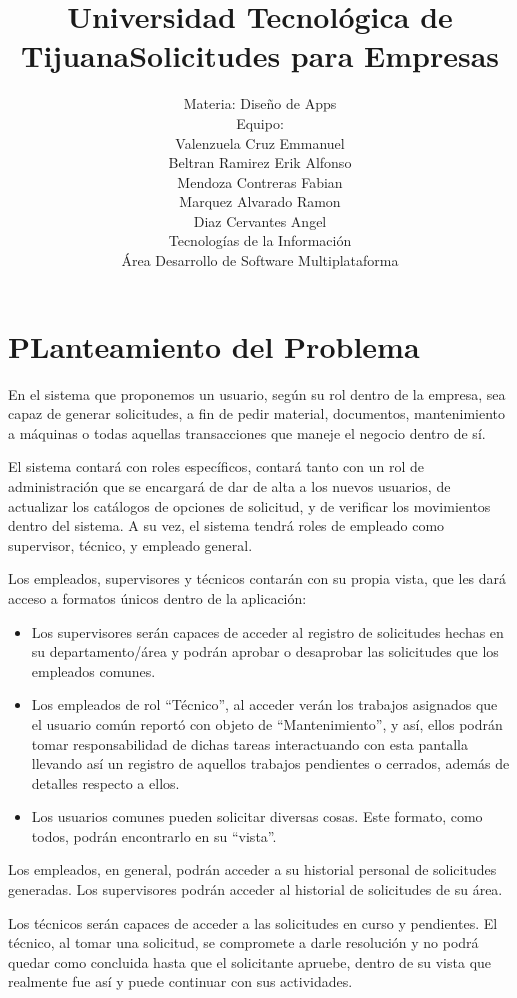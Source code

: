 \documentclass{article}
\title{Universidad Tecnológica de Tijuana}
\author{Materia: Diseño de Apps\\Equipo:\\Valenzuela Cruz Emmanuel\\Beltran Ramirez Erik Alfonso\\Mendoza Contreras Fabian\\Marquez Alvarado Ramon\\Diaz Cervantes Angel\\Tecnologías de la Información\\Área Desarrollo de Software Multiplataforma}
\date{}
\title{Solicitudes para Empresas}
\date{}
\begin{document}
\maketitle
\vspace{10cm}
\section*{PLanteamiento del Problema}

En el sistema que proponemos un usuario, según su rol dentro de la empresa, sea capaz de generar solicitudes, a fin de pedir material, documentos, mantenimiento a máquinas o todas aquellas transacciones que maneje el negocio dentro de sí.

El sistema contará con roles específicos, contará tanto con un rol de administración que se encargará de dar de alta a los nuevos usuarios, de actualizar los catálogos de opciones de solicitud, y de verificar los movimientos dentro del sistema. A su vez, el sistema tendrá roles de empleado como supervisor, técnico, y empleado general.

Los empleados, supervisores y técnicos contarán con su propia vista, que les dará acceso a formatos únicos dentro de la aplicación:
\begin{itemize}
    \item Los supervisores serán capaces de acceder al registro de solicitudes hechas en su departamento/área y podrán aprobar o desaprobar las solicitudes que los empleados comunes.
    \item Los empleados de rol “Técnico”, al acceder verán los trabajos asignados que el usuario común reportó con objeto de “Mantenimiento”, y así, ellos podrán tomar responsabilidad de dichas tareas interactuando con esta pantalla llevando así un registro de aquellos trabajos pendientes o cerrados, además de detalles respecto a ellos.
    \item Los usuarios comunes pueden solicitar diversas cosas. Este formato, como todos, podrán encontrarlo en su “vista”.
\end{itemize}

Los empleados, en general, podrán acceder a su historial personal de solicitudes generadas. Los supervisores podrán acceder al historial de solicitudes de su área.

Los técnicos serán capaces de acceder a las solicitudes en curso y pendientes. El técnico, al tomar una solicitud, se compromete a darle resolución y no podrá quedar como concluida hasta que el solicitante apruebe, dentro de su vista que realmente fue así y puede continuar con sus actividades.
\end{document}
